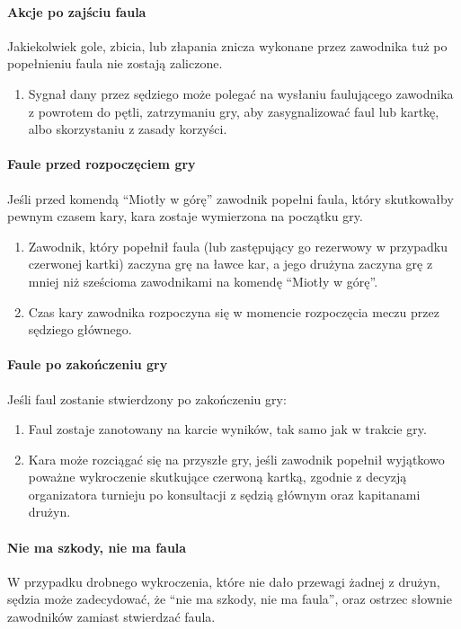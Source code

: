 \documentclass[12pt]{article}
\begin{document}
\paragraph{Akcje po zajściu faula}
Jakiekolwiek gole, zbicia,
lub złapania znicza wykonane przez zawodnika tuż po popełnieniu faula
nie zostają zaliczone.

\begin{enumerate}
\item
    Sygnał dany przez sędziego może polegać na wysłaniu faulującego
  zawodnika z powrotem do pętli, zatrzymaniu gry, aby zasygnalizować
  faul lub kartkę, albo skorzystaniu z zasady korzyści.
  \end{enumerate}

\paragraph{Faule przed rozpoczęciem gry}
Jeśli przed komendą
``Miotły w górę'' zawodnik popełni faula, który skutkowałby pewnym
czasem kary, kara zostaje wymierzona na początku gry.

\begin{enumerate}
\item Zawodnik, który popełnił faula (lub zastępujący go rezerwowy w
przypadku czerwonej kartki) zaczyna grę na ławce kar, a jego drużyna
zaczyna grę z mniej niż sześcioma zawodnikami na komendę ``Miotły w
górę''.

\item Czas kary zawodnika rozpoczyna się w momencie rozpoczęcia meczu przez
sędziego głównego.
\end{enumerate}

\paragraph{Faule po zakończeniu gry}
Jeśli faul zostanie
stwierdzony po zakończeniu gry:

\begin{enumerate}
\item Faul zostaje zanotowany na karcie wyników, tak samo jak w trakcie
gry.

\item Kara może rozciągać się na przyszłe gry, jeśli zawodnik popełnił
wyjątkowo poważne wykroczenie skutkujące czerwoną kartką, zgodnie z
decyzją organizatora turnieju po konsultacji z sędzią głównym oraz
kapitanami drużyn.
\end{enumerate}

\paragraph{Nie ma szkody, nie ma faula}
W przypadku drobnego
wykroczenia, które nie dało przewagi żadnej z drużyn, sędzia może
zadecydować, że ``nie ma szkody, nie ma faula'', oraz ostrzec słownie
zawodników zamiast stwierdzać faula.
\end{document}
